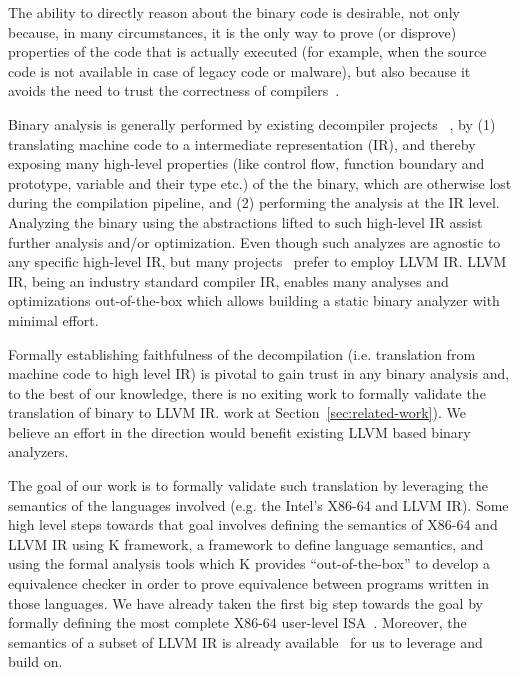 
The ability to directly reason about the binary code is desirable, not only
because, in many circumstances, it is the only way to prove (or disprove)
  properties of the code that is actually executed (for example, when the
      source code is not available in case of legacy code or malware), but also
  because it avoids the need to trust the correctness of
  compilers~\cite{Thompson,WYSINWYE}.

Binary analysis is generally performed by existing decompiler projects
~\cite{McSema:Recon14,Remill,Angr1,BAP:CAV11,Radare2}, by (1) translating
machine code to a intermediate representation (IR), and thereby exposing many
high-level properties (like control flow, function boundary and prototype,
    variable and their type etc.) of the the binary, which are otherwise lost
during the compilation pipeline, and (2) performing the analysis at the IR
level.  Analyzing the binary using the abstractions lifted to such high-level
IR assist further analysis and/or optimization. Even though such analyzes are
agnostic to any specific high-level IR, but many
projects~\cite{McSema:Recon14,Remill,FCD,reopt,llvm-mctoll} prefer to employ
LLVM IR. LLVM IR, being an industry standard compiler IR, enables many analyses
and optimizations out-of-the-box which allows building a static binary analyzer
with minimal effort.

Formally establishing faithfulness of the decompilation (i.e. translation from
    machine code to high level IR) is pivotal to gain trust in any binary
analysis and, to the best of our knowledge, there is no exiting work to
formally validate the translation of binary to LLVM IR.%
    work at Section~\ref{sec:related-work}).  We believe an effort in the
direction would benefit existing LLVM based binary analyzers.

The goal of our work is to formally validate such translation by leveraging the
semantics of the languages involved (e.g. the Intel's X86-64 and LLVM IR). Some
high level steps towards that goal involves defining the semantics of X86-64
and LLVM IR using K framework, a framework to define language semantics, and
using the formal analysis tools which K provides ``out-of-the-box'' to develop
a equivalence checker in order to prove equivalence between programs written in
those languages.  We have already taken the first big step towards the goal by
formally defining the most complete X86-64 user-level
ISA~\cite{DasguptaAdve:PLDI19}. Moreover, the semantics of a subset of LLVM IR
is already available~\cite{LLVMSEMA} for us to leverage and build on.

